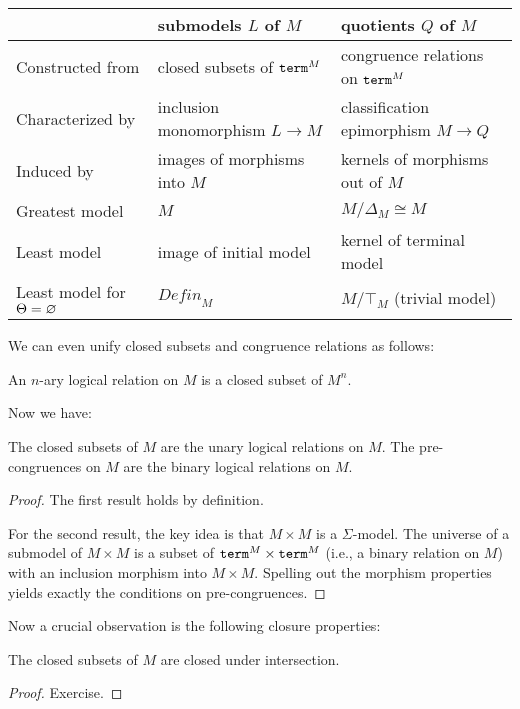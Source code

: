 \begin{center}
\begin{tabular}{|l||l|l|}
\hline
 & submodels $L$ of $M$& quotients $Q$ of $M$ \\
\hline
Constructed from & closed subsets of $\mathtt{term}^M$ & congruence relations on $\mathtt{term}^M$ \\
Characterized by & inclusion monomorphism $L\to M$ & classification epimorphism $M\to Q$ \\
Induced by & images of morphisms into $M$ & kernels of morphisms out of $M$ \\
Greatest model & $M$ & $M/\Delta_M\cong M$ \\
Least model & image of initial model & kernel of terminal model \\
Least model for $\Theta=\varnothing$ & $\mathit{Defin}_M$ & $M/\top_M$ (trivial model) \\
\hline
\end{tabular}
\end{center}

We can even unify closed subsets and congruence relations as follows:
\begin{definition}
An $n$-ary logical relation on $M$ is a closed subset of $M^n$.
\end{definition}

Now we have:
\begin{theorem}\label{thm:univ:closedcong}
The closed subsets of $M$ are the unary logical relations on $M$.
The pre-congruences on $M$ are the binary logical relations on $M$.
\end{theorem}
\begin{proof}
The first result holds by definition.

For the second result, the key idea is that $M\times M$ is a $\Sigma$-model.
The universe of a submodel of $M\times M$ is a subset of $\mathtt{term}^M\times\mathtt{term}^M$ (i.e., a binary relation on $M$) with an inclusion morphism into $M\times M$.
Spelling out the morphism properties yields exactly the conditions on pre-congruences.
\end{proof}

Now a crucial observation is the following closure properties:

\begin{theorem}\label{thm:univ:closedinter}
The closed subsets of $M$ are closed under intersection.
\end{theorem}
\begin{proof}
Exercise.
\end{proof}

